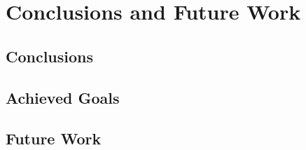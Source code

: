 \chapter{Conclusions and Future Work}
\justifying

\section{Conclusions}

\section{Achieved Goals}

\section{Future Work}